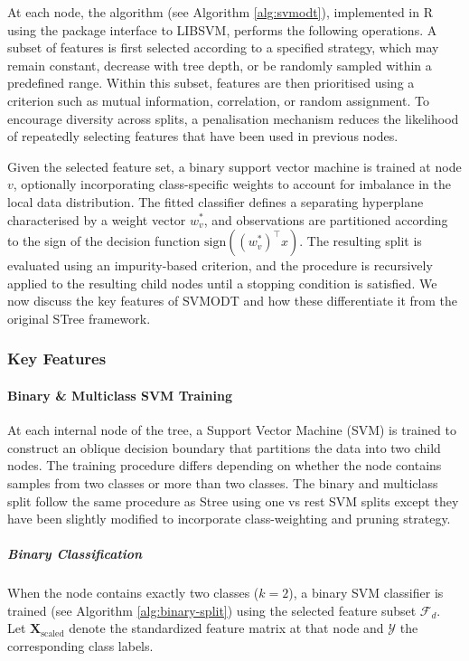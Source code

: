 At each node, the algorithm (see Algorithm \ref{alg:svmodt}), implemented in R using the  package interface to LIBSVM, performs the following operations. A subset of features is first selected according to a specified strategy, which may remain constant, decrease with tree depth, or be randomly sampled within a predefined range. Within this subset, features are then prioritised using a criterion such as mutual information, correlation, or random assignment. To encourage diversity across splits, a penalisation mechanism reduces the likelihood of repeatedly selecting features that have been used in previous nodes.

Given the selected feature set, a binary support vector machine is trained at node \(v\), optionally incorporating class-specific weights to account for imbalance in the local data distribution. The fitted classifier defines a separating hyperplane characterised by a weight vector \(w_v^\ast\), and observations are partitioned according to the sign of the decision function \(\mathrm{sign}((w_v^\ast)^\top x)\). The resulting split is evaluated using an impurity-based criterion, and the procedure is recursively applied to the resulting child nodes until a stopping condition is satisfied. We now discuss the key features of SVMODT and how these differentiate it from the original STree framework.

\subsubsection{Key Features}\label{key-features}

\paragraph{Binary \& Multiclass SVM Training}\label{binary-multiclass-svm-training}

At each internal node of the tree, a Support Vector Machine (SVM) is trained to construct an oblique decision boundary that partitions the data into two child nodes. The training procedure differs depending on whether the node contains samples from two classes or more than two classes. The binary and multiclass split follow the same procedure as Stree using one vs rest SVM splits except they have been slightly modified to incorporate class-weighting and pruning strategy.

\subparagraph{Binary Classification}\label{binary-classification}

When the node contains exactly two classes (\(k = 2\)), a binary SVM classifier is trained (see Algorithm \ref{alg:binary-split}) using the selected feature subset \(\mathcal{F}_d\). Let \(\mathbf{X}_{\text{scaled}}\) denote the standardized feature matrix at that node and \(\mathcal{Y}\) the corresponding class labels.

